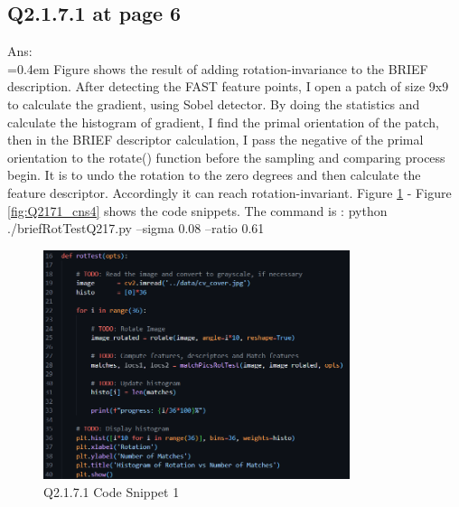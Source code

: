 \documentclass{article}
\begin{document}
	\newpage
	\subsection*{Q2.1.7.1 at page 6}
	Ans:\\
	\hangindent=0.4em \hspace{0.3em} Figure shows the result of adding rotation-invariance to the BRIEF description. After detecting the FAST feature points, I open a patch of size 9x9 to calculate the gradient, using Sobel detector. By doing the statistics and calculate the histogram of gradient, I find the primal orientation of the patch, then in the BRIEF descriptor calculation, I pass the negative of the primal orientation to the rotate() function before the sampling and comparing process begin. It is to undo the rotation to the zero degrees and then calculate the feature descriptor. Accordingly it can reach rotation-invariant. Figure \ref{fig:Q2171_cns1} - Figure \ref{fig:Q2171_cns4} shows the code snippets. The command is : python ./briefRotTestQ217.py --sigma 0.08 --ratio 0.61 
	\begin{figure}[H]		
	\centering
	\includegraphics[width=0.8\textwidth]{Q2_1_7_1_cns1.png}  %
	\caption{Q2.1.7.1 Code Snippet 1}
	\label{fig:Q2171_cns1}
	\end{figure}
\end{document}
